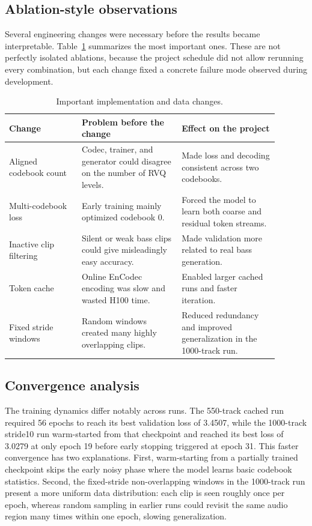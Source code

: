 \documentclass{article}
\begin{document}
\subsection{Ablation-style observations}

Several engineering changes were necessary before the results became interpretable. Table~\ref{tab:ablation} summarizes the most important ones. These are not perfectly isolated ablations, because the project schedule did not allow rerunning every combination, but each change fixed a concrete failure mode observed during development.

\begin{table}[t]
\centering
\caption{Important implementation and data changes.}
\label{tab:ablation}
\small
\begin{tabular}{p{0.24\linewidth}p{0.33\linewidth}p{0.32\linewidth}}
\toprule
Change & Problem before the change & Effect on the project \\
\midrule
Aligned codebook count & Codec, trainer, and generator could disagree on the number of RVQ levels. & Made loss and decoding consistent across two codebooks. \\
Multi-codebook loss & Early training mainly optimized codebook 0. & Forced the model to learn both coarse and residual token streams. \\
Inactive clip filtering & Silent or weak bass clips could give misleadingly easy accuracy. & Made validation more related to real bass generation. \\
Token cache & Online EnCodec encoding was slow and wasted H100 time. & Enabled larger cached runs and faster iteration. \\
Fixed stride windows & Random windows created many highly overlapping clips. & Reduced redundancy and improved generalization in the 1000-track run. \\
\bottomrule
\end{tabular}
\end{table}

\subsection{Convergence analysis}

The training dynamics differ notably across runs. The 550-track cached run required 56 epochs to reach its best validation loss of 3.4507, while the 1000-track stride10 run warm-started from that checkpoint and reached its best loss of 3.0279 at only epoch 19 before early stopping triggered at epoch 31. This faster convergence has two explanations. First, warm-starting from a partially trained checkpoint skips the early noisy phase where the model learns basic codebook statistics. Second, the fixed-stride non-overlapping windows in the 1000-track run present a more uniform data distribution: each clip is seen roughly once per epoch, whereas random sampling in earlier runs could revisit the same audio region many times within one epoch, slowing generalization.
\end{document}
